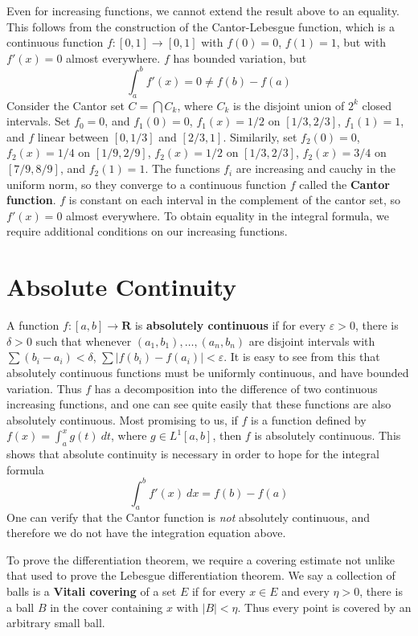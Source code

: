 Even for increasing functions, we cannot extend the result above to an equality. This follows from the construction of the Cantor-Lebesgue function, which is a continuous function $f:[0,1] \to [0,1]$ with $f(0) = 0$, $f(1) = 1$, but with $f'(x) = 0$ almost everywhere. $f$ has bounded variation, but
%
\[ \int_a^b f'(x) = 0 \neq f(b) - f(a) \]
%
Consider the Cantor set $C = \bigcap C_k$, where $C_k$ is the disjoint union of $2^k$ closed intervals. Set $f_0 = 0$, and $f_1(0) = 0$, $f_1(x) = 1/2$ on $[1/3,2/3]$, $f_1(1) = 1$, and $f$ linear between $[0,1/3]$ and $[2/3,1]$. Similarily, set $f_2(0) = 0$, $f_2(x) = 1/4$ on $[1/9, 2/9]$, $f_2(x) = 1/2$ on $[1/3,2/3]$, $f_2(x) = 3/4$ on $[7/9,8/9]$, and $f_2(1) = 1$. The functions $f_i$ are increasing and cauchy in the uniform norm, so they converge to a continuous function $f$ called the {\bf Cantor function}. $f$ is constant on each interval in the complement of the cantor set, so $f'(x) = 0$ almost everywhere. To obtain equality in the integral formula, we require additional conditions on our increasing functions.

\section{Absolute Continuity}

A function $f: [a,b] \to \mathbf{R}$ is {\bf absolutely continuous} if for every $\varepsilon > 0$, there is $\delta > 0$ such that whenever $(a_1, b_1), \dots, (a_n,b_n)$ are disjoint intervals with $\sum (b_i - a_i) < \delta$, $\sum |f(b_i) - f(a_i)| < \varepsilon$. It is easy to see from this that absolutely continuous functions must be uniformly continuous, and have bounded variation. Thus $f$ has a decomposition into the difference of two continuous increasing functions, and one can see quite easily that these functions are also absolutely continuous. Most promising to us, if $f$ is a function defined by $f(x) = \int_a^x g(t)\ dt$, where $g \in L^1[a,b]$, then $f$ is absolutely continuous. This shows that absolute continuity is necessary in order to hope for the integral formula
%
\[ \int_a^b f'(x)\ dx = f(b) - f(a) \]
%
One can verify that the Cantor function is {\it not} absolutely continuous, and therefore we do not have the integration equation above.

To prove the differentiation theorem, we require a covering estimate not unlike that used to prove the Lebesgue differentiation theorem. We say a collection of balls is a {\bf Vitali covering} of a set $E$ if for every $x \in E$ and every $\eta > 0$, there is a ball $B$ in the cover containing $x$ with $|B| < \eta$. Thus every point is covered by an arbitrary small ball.

